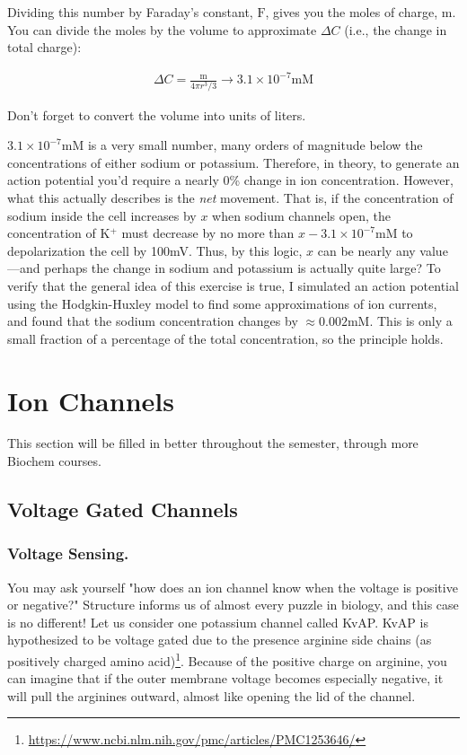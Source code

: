 \documentclass[12pt]{report}
\begin{document}
\bigskip

Dividing this number by Faraday's constant, $\mathrm{F}$, gives you the moles of charge, $\mathrm{m}$. You can divide the moles by the volume to approximate $\Delta C$ (i.e., the change in total charge):

\begin{equation} \label{eq8}
\begin{split}
\Delta C = \frac{\mathrm{m}}{4\pi r^3 /3} \rightarrow 3.1 \times 10^{-7} \mathrm{mM}
\end{split}
\end{equation}

Don't forget to convert the volume into units of liters.\newline

$3.1 \times 10^{-7} \mathrm{mM}$ is a very small number, many orders of magnitude below the concentrations of either sodium or potassium. Therefore, in theory, to generate an action potential you'd require a nearly 0\% change in ion concentration. However, what this actually describes is the \textit{net} movement. That is, if the concentration of sodium inside the cell increases by $x$ when sodium channels open, the concentration of K$^+$ must decrease by no more than $x - 3.1 \times 10^{-7} \mathrm{mM}$ to depolarization the cell by 100mV. Thus, by this logic, $x$ can be nearly any value---and perhaps the change in sodium and potassium is actually quite large? To verify that the general idea of this exercise is true, I simulated an action potential using the Hodgkin-Huxley model to find some approximations of ion currents, and found that the sodium concentration changes by $\approx 0.002$mM. This is only a small fraction of a percentage of the total concentration, so the principle holds. 




\section{Ion Channels}


This section will be filled in better throughout the semester, through more Biochem courses. 


\subsection{Voltage Gated Channels}


\subsubsection{Voltage Sensing.}
You may ask yourself "how does an ion channel know when the voltage is positive or negative?" Structure informs us of almost every puzzle in biology, and this case is no different! Let us consider one potassium channel called KvAP. KvAP is hypothesized to be voltage gated due to the presence arginine side chains (as positively charged amino acid)\footnote{\url{https://www.ncbi.nlm.nih.gov/pmc/articles/PMC1253646/}}. Because of the positive charge on arginine, you can imagine that if the outer membrane voltage becomes especially negative, it will pull the arginines outward, almost like opening the lid of the channel.
\end{document}
